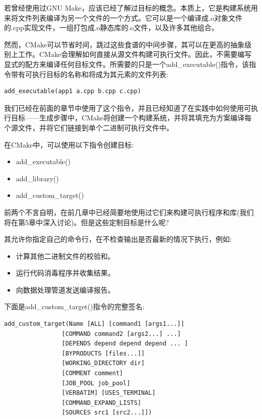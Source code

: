 
若曾经使用过GNU Make，应该已经了解过目标的概念。本质上，它是构建系统用来将文件列表编译为另一个文件的一个方式。它可以是一个编译成.o对象文件的.cpp实现文件，一组打包成.o静态库的.o文件，以及许多其他组合。

然而，CMake可以节省时间，跳过这些食谱的中间步骤，其可以在更高的抽象级别上工作。CMake会理解如何直接从源文件构建可执行文件。因此，不需要编写显式的配方来编译任何目标文件。所需要的只是一个add\_executable()指令，该指令带有可执行目标的名称和将成为其元素的文件列表:

\begin{lstlisting}[style=styleCMake]
add_executable(app1 a.cpp b.cpp c.cpp)
\end{lstlisting}

我们已经在前面的章节中使用了这个指令，并且已经知道了在实践中如何使用可执行目标——生成步骤中，CMake将创建一个构建系统，并将其填充为方案编译每个源文件，并将它们链接到单个二进制可执行文件中。

在CMake中，可以使用以下指令创建目标:

\begin{itemize}
\item 
add\_executable()

\item 
add\_library()

\item 
add\_custom\_target()
\end{itemize}

前两个不言自明，在前几章中已经简要地使用过它们来构建可执行程序和库(我们将在第5章中深入讨论)。但是这些定制目标是什么呢?

其允许你指定自己的命令行，在不检查输出是否最新的情况下执行，例如:

\begin{itemize}
\item 
计算其他二进制文件的校验和。

\item 
运行代码消毒程序并收集结果。

\item 
向数据处理管道发送编译报告。
\end{itemize}

下面是add\_custom\_target()指令的完整签名:

\begin{lstlisting}[style=styleCMake]
add_custom_target(Name [ALL] [command1 [args1...]]
				[COMMAND command2 [args2...] ...]
				[DEPENDS depend depend depend ... ]
				[BYPRODUCTS [files...]]
				[WORKING_DIRECTORY dir]
				[COMMENT comment]
				[JOB_POOL job_pool]
				[VERBATIM] [USES_TERMINAL]
				[COMMAND_EXPAND_LISTS]
				[SOURCES src1 [src2...]])
\end{lstlisting}

